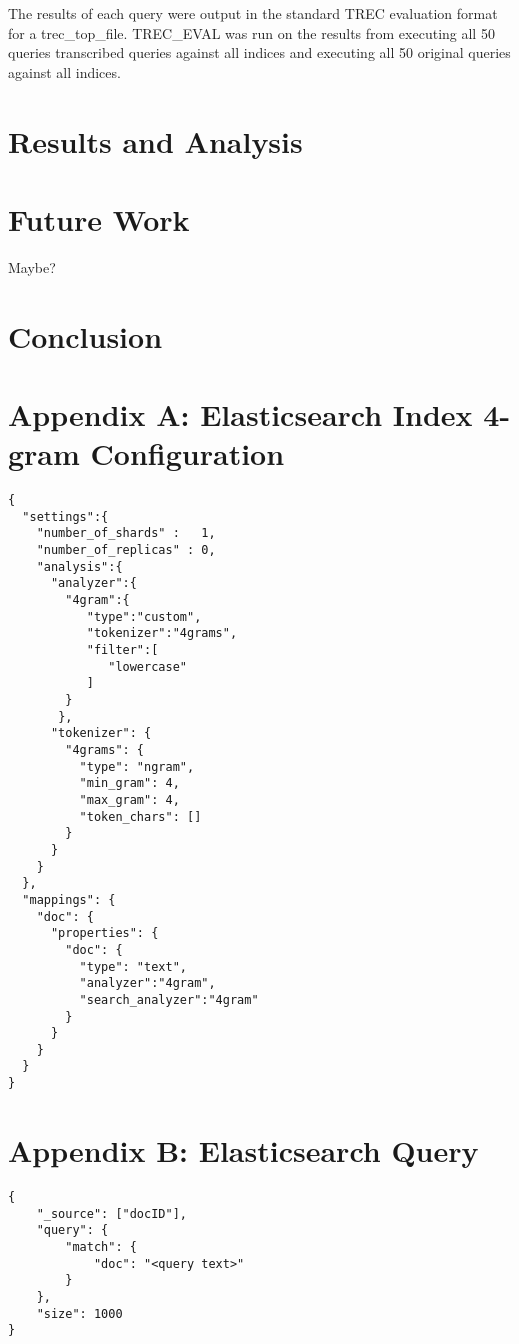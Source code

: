 \documentclass[jair, twoside,11pt,theapa]{article}
\begin{document}
The results of each query were output in the standard TREC evaluation format for a trec\_top\_file. TREC\_EVAL was run on the results from executing all 50 queries transcribed queries against all indices and executing all 50 original queries against all indices.


\section{Results and Analysis}
\label{Results}


\section{Future Work}
\label{Future}
Maybe? 

\section{Conclusion}
\label{Conclusion}



\vskip 0.2in



\raggedbottom
\pagebreak 

\section*{Appendix A: Elasticsearch Index 4-gram Configuration}
\begin{verbatim}
{
  "settings":{
    "number_of_shards" :   1,
    "number_of_replicas" : 0,
    "analysis":{
      "analyzer":{
        "4gram":{ 
           "type":"custom",
           "tokenizer":"4grams",
           "filter":[
              "lowercase"
           ]
        }
       },
      "tokenizer": {
        "4grams": {
          "type": "ngram",
          "min_gram": 4,
          "max_gram": 4,
          "token_chars": []
        }
      }
    }
  },
  "mappings": {
    "doc": {
      "properties": {
        "doc": { 
          "type": "text",
          "analyzer":"4gram",
          "search_analyzer":"4gram"
        }
      }
    }
  }
}
\end{verbatim}

\pagebreak

\section*{Appendix B: Elasticsearch Query}
\label{Appendix B}
\begin{verbatim}
{
    "_source": ["docID"],
    "query": {
        "match": {
            "doc": "<query text>"
        }
    },
    "size": 1000
}
\end{verbatim}
\end{document}
